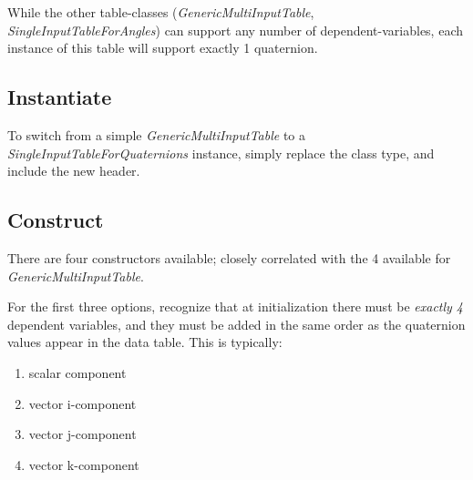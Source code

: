\documentclass[11pt,fleqn]{report}
\begin{document}
While the other table-classes (\textit{GenericMultiInputTable},
\textit{SingleInputTableForAngles}) can support any number of
dependent-variables, each instance of this table will support
exactly 1 quaternion.

\subsection{Instantiate}
To switch from a simple \textit{GenericMultiInputTable} to a
\textit{SingleInputTableForQuaternions} instance, simply replace the class
type, and include the new header.

\subsection{Construct}
There are four constructors available; closely correlated with the 4
available for \textit{GenericMultiInputTable}.

For the first three options, recognize that at initialization there must be
\textit{exactly 4} dependent variables, and they must be
added in the same order as the
quaternion values appear in the data table.  This is typically:
\begin{enumerate}
 \item scalar component
 \item vector i-component
 \item vector j-component
 \item vector k-component
\end{enumerate}
\end{document}
